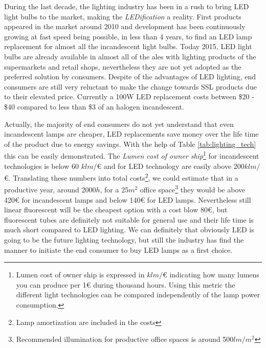 During the last decade, the lighting industry has been in a rush to bring LED light bulbs to the market, making the \emph{LEDification} a reality. First products appeared in the market around 2010 and development has been continuously growing at fast speed being possible, in less than 4 years, to find an LED lamp replacement for almost all the incandescent light bulbs. Today 2015, LED light bulbs are already available in almost all of the ales with lighting products of the supermarkets and retail shops, nevertheless they are not yet adopted as the preferred solution by consumers. Despite of the advantages of LED lighting, end consumers are still very reluctant to make the change towards SSL products due to their elevated price. Currently a 100W LED replacement costs between \$20 - \$40 compared to less than \$3 of an halogen incandescent.

Actually, the majority of end consumers do not yet understand that even incandescent lamps are cheaper, LED replacements save money over the life time of the product due to energy savings. With the help of Table \ref{tab:lighting_tech} this can be easily demonstrated. The \emph{Lumen cost of owner ship}\footnote{Lumen cost of owner ship is expressed in $klm/$€ indicating how many lumens you can produce per 1€ during thousand hours. Using this metric the different light technologies can be compared independently of the lamp power consumption.} for incandescent technologies is below 60 $klm/$€ and for LED technology are easily above 200$klm/$€. Translating these numbers into total costs\footnote{Lamp amortization are included in the costs}, we could estimate that in a productive year, around 2000$h$, for a 25$ m^2 $  office space\footnote{Recommended illumination for productive office spaces is around 500$ lm/m^2 $ } they would be above 420€ for incandescent lamps and below 140€ for LED lamps. Nevertheless still linear fluorescent will be the cheapest option with a cost blow 80€, but fluorescent tubes are definitely not suitable for general use and their life time is much short compared to LED lighting. We can definitely that obviously LED is going to be the future lighting technology, but still the industry has find the manner to initiate the end consumer to buy LED lamps as a first choice.


